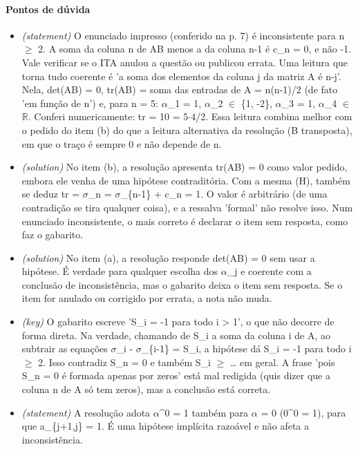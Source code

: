 \documentclass{article}%
\begin{document}
\paragraph{Pontos de dúvida}%
\begin{itemize}%
\item%
\textit{(statement)} O enunciado impresso (conferido na p. 7) é inconsistente para n $\geq$ 2. A soma da coluna n de AB menos a da coluna n-1 é c\_n = 0, e não -1. Vale verificar se o ITA anulou a questão ou publicou errata. Uma leitura que torna tudo coerente é 'a soma dos elementos da coluna j da matriz A é n-j'. Nela, det(AB) = 0, tr(AB) = soma das entradas de A = n(n-1)/2 (de fato 'em função de n') e, para n = 5: $\alpha$\_1 = 1, $\alpha$\_2 $\in$ \{1, -2\}, $\alpha$\_3 = 1, $\alpha$\_4 $\in$ $\mathbb{R}$. Conferi numericamente: tr = 10 = 5$\cdot$4/2. Essa leitura combina melhor com o pedido do item (b) do que a leitura alternativa da resolução (B transposta), em que o traço é sempre 0 e não depende de n.%
\item%
\textit{(solution)} No item (b), a resolução apresenta tr(AB) = 0 como valor pedido, embora ele venha de uma hipótese contraditória. Com a mesma (H), também se deduz tr = $\sigma$\_n = $\sigma$\_\{n-1\} + c\_n = 1. O valor é arbitrário (de uma contradição se tira qualquer coisa), e a ressalva 'formal' não resolve isso. Num enunciado inconsistente, o mais correto é declarar o item sem resposta, como faz o gabarito.%
\item%
\textit{(solution)} No item (a), a resolução responde det(AB) = 0 sem usar a hipótese. É verdade para qualquer escolha dos $\alpha$\_j e coerente com a conclusão de inconsistência, mas o gabarito deixa o item sem resposta. Se o item for anulado ou corrigido por errata, a nota não muda.%
\item%
\textit{(key)} O gabarito escreve 'S\_i = -1 para todo i > 1', o que não decorre de forma direta. Na verdade, chamando de S\_i a soma da coluna i de A, ao subtrair as equações $\sigma$\_i - $\sigma$\_\{i-1\} = S\_i, a hipótese dá S\_i = -1 para todo i $\geq$ 2. Isso contradiz S\_n = 0 e também S\_i $\geq$ \ldots{} em geral. A frase 'pois S\_n = 0 é formada apenas por zeros' está mal redigida (quis dizer que a coluna n de A só tem zeros), mas a conclusão está correta.%
\item%
\textit{(statement)} A resolução adota $\alpha$\^{}0 = 1 também para $\alpha$ = 0 (0\^{}0 = 1), para que a\_\{j+1,j\} = 1. É uma hipótese implícita razoável e não afeta a inconsistência.%
\end{itemize}%
\end{document}
